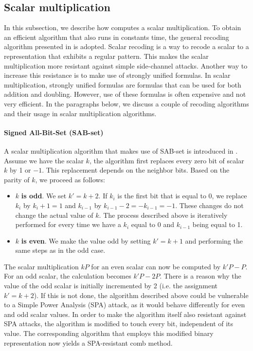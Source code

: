 \subsection{Scalar multiplication} \label{subsec: Scalar multiplication}
In this subsection, we describe how {\fourq} computes a scalar multiplication.
To obtain an efficient algorithm that also runs in constants time, the general recoding algorithm presented in \cite{faz2015efficient} is adopted.
Scalar recoding is a way to recode a scalar to a representation that exhibits a regular pattern.
This makes the scalar multiplication more resistant against simple side-channel attacks.
Another way to increase this resistance is to make use of strongly unified formulas. 
In scalar multiplication, strongly unified formulas are formulas that can be used for both addition and doubling.
However, use of these formulas is often expensive and not very efficient.
In the paragraphs below, we discuss a couple of recoding algorithms and their usage in scalar multiplication algorithms.

\paragraph{Signed All-Bit-Set (SAB-set)}
A scalar multiplication algorithm that makes use of SAB-set is introduced in \cite{hedabou2005countermeasures}.
Assume we have the scalar $k$, the algorithm first replaces every zero bit of scalar $k$ by 1 or $-1$.
This replacement depends on the neighbor bits. Based on the parity of $k$, we proceed as follows:
%
\begin{itemize}
	\item $k$ \textbf{is odd}. We set $k' = k + 2$. If $k_i$ is the first bit that is equal to 0, we replace $k_i$ by $k_i + 1 = 1$ and $k_{i - 1}$ by $k_{i - 1} - 2 = -k_{i - 1} = -1$. These changes do not change the actual value of $k$. 
	The process described above is iteratively performed for every time we have a $k_i$ equal to 0 and $k_{i - 1}$ being equal to 1.
	
	\item $k$ \textbf{is even}. We make the value odd by setting $k' = k + 1$ and performing the same steps as in the odd case.  
\end{itemize}
%
The scalar multiplication $kP$ for an even scalar can now be computed by $k'P - P$.
For an odd scalar, the calculation becomes $k'P - 2P$.
There is a reason why the value of the odd scalar is initially incremented by 2 (i.e. the assignment $k' = k + 2$).
If this is not done, the algorithm described above could be vulnerable to a Simple Power Analysis (SPA) attack, as it would behave differently for even and odd scalar values.
In order to make the algorithm itself also resistant against SPA attacks, the algorithm is modified to touch every bit, independent of its value.
The corresponding algorithm \cite[Algorithm 3]{hedabou2005countermeasures} that employs this modified binary representation now yields a SPA-resistant comb method.

